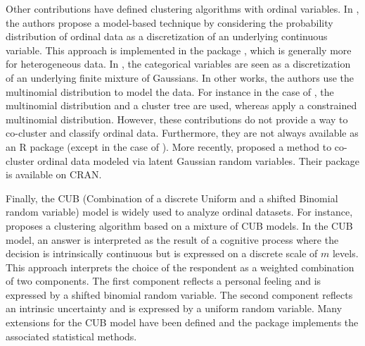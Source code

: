 Other contributions have defined clustering algorithms with ordinal variables. In \cite{McParland2013}, the authors propose a model-based technique by considering the probability distribution of ordinal data as a discretization of an underlying continuous variable. This approach is implemented in the  package \citep{mcparland17}, which is generally more for heterogeneous data. In \cite{Ranalli16}, the categorical variables are seen as a discretization of an underlying finite mixture of Gaussians.  
In other works, the authors use the multinomial distribution to model the data. For instance in the case of \cite{Giordan11}, the multinomial distribution and a cluster tree are used, whereas \cite{jollois09} apply a constrained multinomial distribution. However, these contributions do not provide a way to co-cluster and classify ordinal data. Furthermore, they are not always available as an R package (except in the case of \cite{McParland2013}). More recently, \cite{Corneli20} proposed a method to co-cluster ordinal data modeled via latent Gaussian random variables. Their package  \citep{Corneli2020b} is available on CRAN.

Finally, the CUB (Combination of a discrete Uniform and a shifted Binomial random variable) model \citep{Piccolo2003} is widely used to analyze ordinal datasets. For instance, \cite{corduas2008} proposes a clustering algorithm based on a mixture of CUB models. In the CUB model, an answer is interpreted as the result of a cognitive process where the decision is intrinsically continuous but is expressed on a discrete scale of $m$ levels. This approach interprets the choice of the respondent as a weighted combination of  two components. The first component reflects a personal feeling and is expressed by a shifted binomial random variable. The second component reflects an intrinsic uncertainty and is expressed by a uniform random variable. Many extensions for the CUB model have been defined and the  package \citep{Simone18} implements the associated statistical methods.

